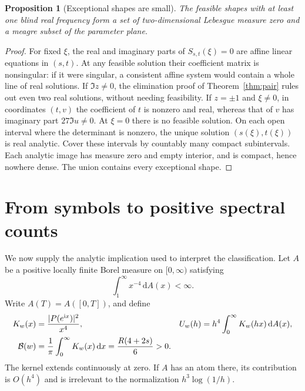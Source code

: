 \documentclass[11pt]{article}
\newtheorem{proposition}[theorem]{Proposition}
\theoremstyle{definition}\newtheorem{definition}[theorem]{Definition}
\theoremstyle{remark}\newtheorem{remark}[theorem]{Remark}
\newcommand{\dd}{\,\mathrm d}\newcommand{\ii}{\mathrm i}
\newcommand{\B}{\mathcal B}
\newcommand{\tauh}{h^3\log(1/h)}
\begin{document}
\begin{proposition}[Exceptional shapes are small]\label{prop:generic}
The feasible shapes with at least one blind real frequency form a set of
two-dimensional Lebesgue measure zero and a meagre subset of the parameter plane.
\end{proposition}
\begin{proof}
For fixed $\xi$, the real and imaginary parts of $S_{s,t}(\xi)=0$ are affine
linear equations in $(s,t)$. At any feasible solution their coefficient matrix
is nonsingular: if it were singular, a consistent affine system would contain
a whole line of real solutions. If $\Im z\ne0$, the elimination proof of
Theorem~\ref{thm:pair} rules out even two real solutions, without needing
feasibility. If $z=\pm1$ and $\xi\ne0$, in coordinates $(t,v)$ the coefficient
of $t$ is nonzero and real, whereas that of $v$ has imaginary part
$27\Im u\ne0$. At $\xi=0$ there is no feasible solution.
On each open interval where the determinant is nonzero, the unique solution
$(s(\xi),t(\xi))$ is real analytic. Cover these intervals by countably many
compact subintervals. Each analytic image has measure zero and empty interior,
and is compact, hence nowhere dense. The union contains every exceptional shape.
\end{proof}

\section{From symbols to positive spectral counts}

We now supply the analytic implication used to interpret the classification.
Let $A$ be a positive locally finite Borel measure on $[0,\infty)$ satisfying
\begin{equation}\label{eq:tailhyp}
 \int_1^\infty x^{-4}\dd A(x)<\infty.
\end{equation}
Write $A(T)=A([0,T])$, and define
\begin{align}\label{eq:variance}
 K_w(x)&=\frac{|P(e^{\ii x})|^2}{x^4},&
 U_w(h)&=h^4\int_0^\infty K_w(hx)\dd A(x),\\
 \B(w)&=\frac1\pi\int_0^\infty K_w(x)\dd x
 =\frac{R(4+2s)}6>0.&\notag
\end{align}
The kernel extends continuously at zero. If $A$ has an atom there, its contribution
is $O(h^4)$ and is irrelevant to the normalization $\tauh$.
\end{document}

